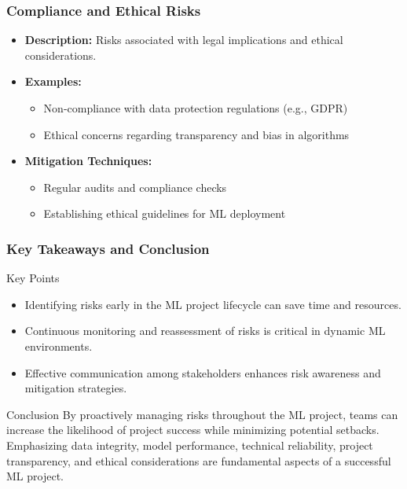 \documentclass[aspectratio=169]{beamer}
\begin{document}
\begin{frame}[fragile]
    \frametitle{Compliance and Ethical Risks}
    \begin{itemize}
        \item \textbf{Description:} Risks associated with legal implications and ethical considerations.
        
        \item \textbf{Examples:}
        \begin{itemize}
            \item Non-compliance with data protection regulations (e.g., GDPR)
            \item Ethical concerns regarding transparency and bias in algorithms
        \end{itemize}

        \item \textbf{Mitigation Techniques:}
        \begin{itemize}
            \item Regular audits and compliance checks
            \item Establishing ethical guidelines for ML deployment
        \end{itemize}
    \end{itemize}
\end{frame}

\begin{frame}[fragile]
    \frametitle{Key Takeaways and Conclusion}
    \begin{block}{Key Points}
        \begin{itemize}
            \item Identifying risks early in the ML project lifecycle can save time and resources.
            \item Continuous monitoring and reassessment of risks is critical in dynamic ML environments.
            \item Effective communication among stakeholders enhances risk awareness and mitigation strategies.
        \end{itemize}
    \end{block}

    \begin{block}{Conclusion}
        By proactively managing risks throughout the ML project, teams can increase the likelihood of project success while minimizing potential setbacks. Emphasizing data integrity, model performance, technical reliability, project transparency, and ethical considerations are fundamental aspects of a successful ML project.
    \end{block}
\end{frame}
\end{document}
